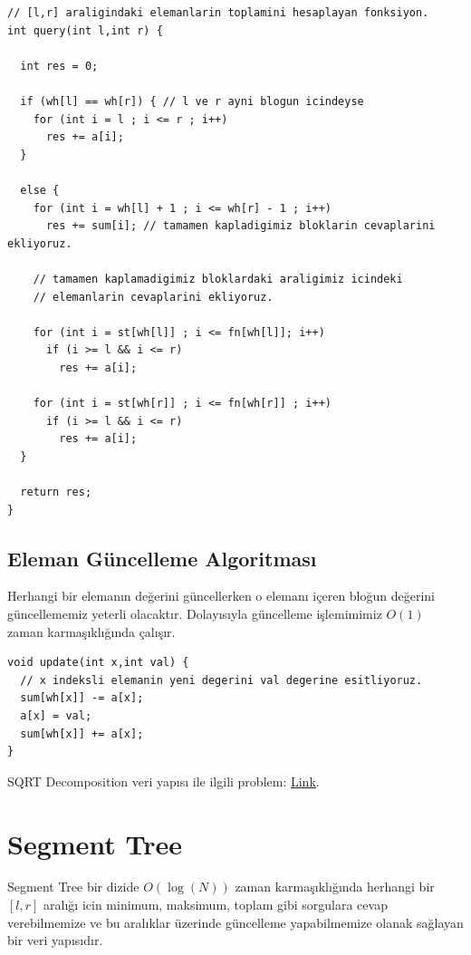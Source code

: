\documentclass[12pt]{article}
\begin{document}
    \begin{verbatim}
// [l,r] araligindaki elemanlarin toplamini hesaplayan fonksiyon.
int query(int l,int r) {

  int res = 0;

  if (wh[l] == wh[r]) { // l ve r ayni blogun icindeyse
    for (int i = l ; i <= r ; i++)
      res += a[i];
  }

  else {
    for (int i = wh[l] + 1 ; i <= wh[r] - 1 ; i++)
      res += sum[i]; // tamamen kapladigimiz bloklarin cevaplarini ekliyoruz.

    // tamamen kaplamadigimiz bloklardaki araligimiz icindeki
    // elemanlarin cevaplarini ekliyoruz.

    for (int i = st[wh[l]] ; i <= fn[wh[l]]; i++)
      if (i >= l && i <= r)
        res += a[i];

    for (int i = st[wh[r]] ; i <= fn[wh[r]] ; i++)
      if (i >= l && i <= r)
        res += a[i];
  }

  return res;
}
    \end{verbatim}    

    \subsection{Eleman G\"{u}ncelleme Algoritmas{\i}}
    
    Herhangi bir eleman{\i}n de\u{g}erini g\"{u}ncellerken o eleman{\i} i\c{c}eren blo\u{g}un de\u{g}erini g\"{u}ncellememiz yeterli olacakt{\i}r. Dolay{\i}s{\i}yla g\"{u}ncelleme i\c{s}lemimimiz $O(1)$ zaman karma\c{s}{\i}kl{\i}\u{g}{\i}nda \c{c}al{\i}\c{s}{\i}r. 
    
    \begin{verbatim}
void update(int x,int val) {
  // x indeksli elemanin yeni degerini val degerine esitliyoruz.
  sum[wh[x]] -= a[x];
  a[x] = val;
  sum[wh[x]] += a[x];
}
    \end{verbatim} 
    
    SQRT Decomposition  veri yap{\i}s{\i} ile ilgili problem: \href{https://codeforces.com/contest/13/problem/E}{Link}.
    \cleardoublepage
    
	\section{Segment Tree}
	
    Segment Tree bir dizide $O(\log(N))$ zaman karma\c{s}{\i}kl{\i}\u{g}{\i}nda herhangi bir $[l,r]$ aral{\i}\u{g}{\i} icin minimum, maksimum, toplam gibi sorgulara cevap verebilmemize ve bu aral{\i}klar \"{u}zerinde g\"{u}ncelleme yapabilmemize olanak sa\u{g}layan bir veri yap{\i}s{\i}d{\i}r.
    
\end{document}
